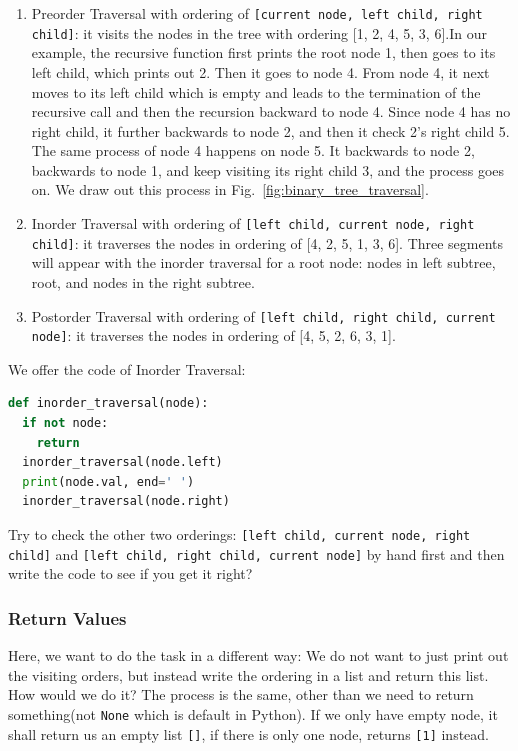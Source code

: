 \documentclass[../main.tex]{subfiles}
\begin{document}
\begin{enumerate}[label=(\alph*)]
\item Preorder Traversal with ordering of  \texttt{[current node, left child, right child]}: it visits the nodes in the tree with ordering [1, 2, 4, 5, 3, 6].In our example, the recursive function first prints the root node 1, then goes to its left child, which prints out 2. Then it goes to node 4. From node 4, it next moves to its left child which is empty and leads to the termination of  the recursive call and then the recursion backward to node 4. Since node 4 has no right child, it further backwards to node 2, and then it check 2's right child 5. The same process of node 4 happens on node 5. It backwards to node 2, backwards to node 1, and keep visiting its right child 3, and the process goes on. We draw out this process in Fig.~\ref{fig:binary_tree_traversal}. 
\item Inorder Traversal with ordering of  \texttt{[left child, current node, right child]}: it traverses the nodes in ordering of [4, 2, 5, 1, 3, 6]. Three segments will appear with the inorder traversal for a root node: nodes in left subtree, root, and nodes in the right subtree.
\item Postorder Traversal with ordering of \texttt{[left child, right child, current node]}:  it traverses the nodes in ordering of [4, 5, 2, 6, 3, 1]. 
\end{enumerate}
We offer the code of Inorder Traversal:
\begin{lstlisting}[language=Python]
def inorder_traversal(node):
  if not node:
    return
  inorder_traversal(node.left)
  print(node.val, end=' ')
  inorder_traversal(node.right)
\end{lstlisting}




\begin{bclogo}[couleur = blue!30, arrondi=0.1,logo=\bccrayon,ombre=true]{Try to check  the other two orderings: \texttt{[left child, current node, right child]} and \texttt{[left child, right child, current node]} by hand first and then write the code to see if you get it right?} 
\end{bclogo}



\subsubsection{Return Values} 
Here, we want to do the task in a different way: We do not want to just print out the visiting orders, but instead write the ordering in a list and return this list. How would we do it? The process is the same, other than  we need to return something(not \texttt{None} which is default in Python). If we only have empty node, it shall return us an empty list \texttt{[]}, if there is only one node, returns \texttt{[1]} instead. 
\end{document}
